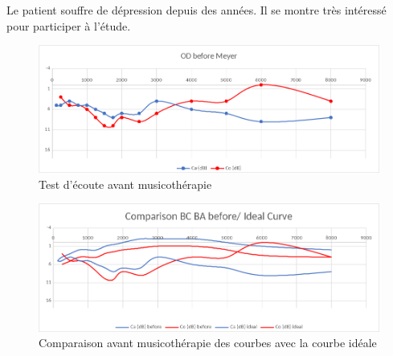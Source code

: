  	Le patient souffre de dépression depuis des années. Il se montre très
        intéressé pour participer à l'étude.
 
 	
 	\begin{figure}[tbh]
 		\centering
 		\includegraphics[width=0.7\linewidth]{images/clinique/od_before_meyer.png}
 		\caption{Test d'écoute avant musicothérapie}
 		\label{fig:odbeforemeyer}
 	\end{figure}
 	

	
 	\begin{figure}
 		\centering
 		\includegraphics[width=0.7\linewidth]{images/clinique/comparison_bc_ba_before_vs_ideal_curve_meyer.png}
 		\caption[Comparaison avec la courbe idéale]{Comparaison avant
                  musicothérapie des
                  courbes  avec la courbe idéale}
 		\label{fig:comparisonbcbabeforevsidealcurvemeyer}
 	\end{figure}


	
